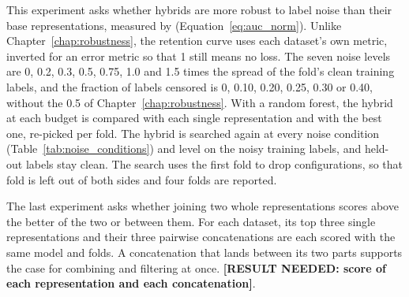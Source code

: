 This experiment asks whether hybrids are more robust to label noise than their base representations, measured by \aucnorm{} (Equation~\ref{eq:auc_norm}). Unlike Chapter~\ref{chap:robustness}, the retention curve uses each dataset's own metric, inverted for an error metric so that 1 still means no loss. The seven noise levels are 0, 0.2, 0.3, 0.5, 0.75, 1.0 and 1.5 times the spread of the fold's clean training labels, and the fraction of labels censored is 0, 0.10, 0.20, 0.25, 0.30 or 0.40, without the 0.5 of Chapter~\ref{chap:robustness}. With a random forest, the hybrid at each budget is compared with each single representation and with the best one, re-picked per fold. The hybrid is searched again at every noise condition (Table~\ref{tab:noise_conditions}) and level on the noisy training labels, and held-out labels stay clean. The search uses the first fold to drop configurations, so that fold is left out of both sides and four folds are reported.

The last experiment asks whether joining two whole representations scores above the better of the two or between them. For each dataset, its top three single representations and their three pairwise concatenations are each scored with the same model and folds. A concatenation that lands between its two parts supports the case for combining and filtering at once. \textbf{[RESULT NEEDED: score of each representation and each concatenation]}.


